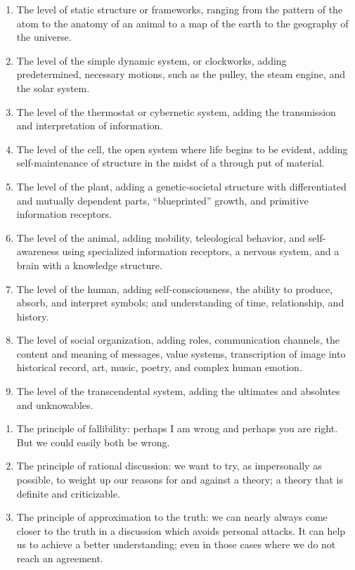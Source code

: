 \begin{enumerate}
	\item The level of static structure or frameworks, ranging from the pattern of the atom to the anatomy of an animal to a map of the earth to the geography of the universe.
	\item The level of the simple dynamic system, or clockworks, adding predetermined, necessary motions, such as the pulley, the steam engine, and the solar system.
	\item The level of the thermostat or cybernetic system, adding the transmission and interpretation of information.
	\item The level of the cell, the open system where life begins to be evident, adding self-maintenance of structure in the midst of a through put of material.
	\item The level of the plant, adding a genetic-societal structure with differentiated and mutually dependent parts, “blueprinted” growth, and primitive information receptors.
	\item The level of the animal, adding mobility, teleological behavior, and self-awareness using specialized information receptors, a nervous system, and a brain with a knowledge structure.
	\item The level of the human, adding self-consciousness, the ability to produce, absorb, and interpret symbols; and understanding of time, relationship, and history.
	\item The level of social organization, adding roles, communication channels, the content and meaning of messages, value systems, transcription of image into historical record, art, music, poetry, and complex human emotion.
	\item The level of the transcendental system, adding the ultimates and absolutes and unknowables.
\end{enumerate}

\begin{enumerate}
	\item The principle of fallibility: perhaps I am wrong and perhaps you are right. But we could easily both be wrong.
	\item The principle of rational discussion: we want to try, as impersonally as possible, to weight up our reasons for and against a theory; a theory that is definite and criticizable.
	\item The principle of approximation to the truth: we can nearly always come closer to the truth in a discussion which avoids personal attacks. It can help us to achieve a better understanding; even in those cases where we do not reach an agreement.
\end{enumerate}

